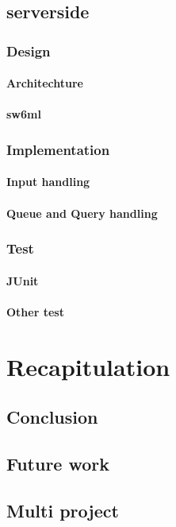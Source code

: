   \section{serverside} %
    \subsection{Design}
      \subsubsection{Architechture}
      \subsubsection{sw6ml}
    \subsection{Implementation}
      \subsubsection{Input handling}
      \subsubsection{Queue and Query handling}
    \subsection{Test}
      \subsubsection{JUnit}
      \subsubsection{Other test}

\chapter{Recapitulation}
  \section{Conclusion}
  \section{Future work}
  \section{Multi project} %



\appendix


